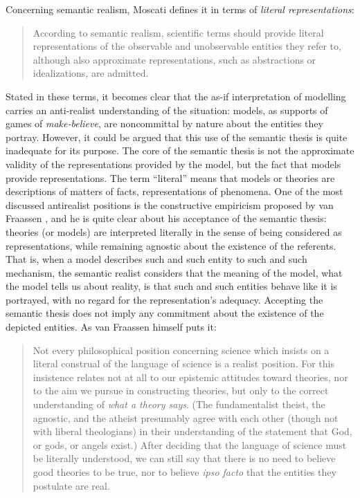 \documentclass[a4paper,11pt]{article}
\theoremstyle{definition}
\begin{document}
Concerning semantic realism, Moscati defines it in terms of \textit{literal representations}:

\begin{quote}
    According to semantic realism, scientific terms should provide literal representations of the observable and unobservable entities they refer to, although also approximate representations, such as abstractions or idealizations, are admitted. \citep[p.~18]{Moscati2023}
\end{quote}

Stated in these terms, it becomes clear that the as-if interpretation of modelling carries an anti-realist understanding of the situation: models, as supports of games of \textit{make-believe}, are noncommittal by nature about the entities they portray. However, it could be argued that this use of the semantic thesis is quite inadequate for its purpose. The core of the semantic thesis is not the approximate validity of the representations provided by the model, but the fact that models provide representations. The term ``literal'' means that models or theories are descriptions of matters of facts, representations of phenomena. One of the most discussed antirealist positions is the constructive empiricism proposed by van Fraassen \citep{vanFraassen1980}, and he is quite clear about his acceptance of the semantic thesis: theories (or models) are interpreted literally in the sense of being considered as representations, while remaining agnostic about the existence of the referents. That is, when a model describes such and such entity to such and such mechanism, the semantic realist considers that the meaning of the model, what the model tells us about reality, is that such and such entities behave like it is portrayed, with no regard for the representation's adequacy. Accepting the semantic thesis does not imply any commitment about the existence of the depicted entities. As van Fraassen himself puts it:

\begin{quote}
    Not every philosophical position concerning science which insists on a literal construal of the language of science is a realist position. For this insistence relates not at all to our epistemic attitudes toward theories, nor to the aim we pursue in constructing theories, but only to the correct understanding of \textit{what a theory says}. (The fundamentalist theist, the agnostic, and the atheist presumably agree with each other (though not with liberal theologians) in their understanding of the statement that God, or gods, or angels exist.) After deciding that the language of science must be literally understood, we can still say that there is no need to believe good theories to be true, nor to believe \textit{ipso facto} that the entities they postulate are real. \citep[pp.~11-12]{vanFraassen1980}
\end{quote}
\end{document}
